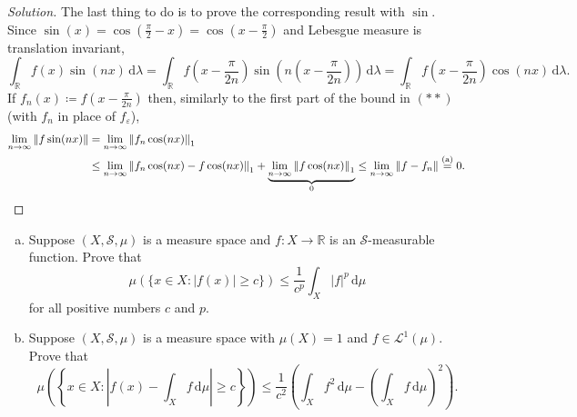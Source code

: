 \documentclass[10pt]{article}
\newcommand{\dd}{\,\mathrm{d}}
\providecommand{\eps}{\varepsilon}
\providecommand{\RR}{\mathbb R}
\providecommand{\ii}{\item}
\newenvironment{soln}{\begin{proof}[Solution]}{\end{proof}}
\providecommand{\abs}[1]{\left\lvert #1\right\rvert}
\providecommand{\norm}[1]{\left\| #1\right\|}
\begin{document}
\begin{soln}
    The last thing to do is to prove the corresponding result with $\sin$.
    Since $\sin(x) = \cos(\frac\pi2 - x) = \cos(x - \frac\pi2)$
    and Lebesgue measure is translation invariant,
    \begin{equation*}
	\int_{\RR} f(x)\sin(nx)\dd\lambda =
	\int_{\RR}f\left(x-\frac\pi{2n}\right)
	\sin\left(n\left(x-\frac\pi{2n}\right)\right)\dd\lambda
	= \int_{\RR}f\left(x-\frac\pi{2n}\right)\cos(nx)\dd\lambda.
    \end{equation*}
    If $f_n(x) \coloneq f(x - \frac\pi{2n})$ then,
    similarly to the first part of the bound in $(**)$
    (with $f_n$ in place of $f_\eps$),
    \begin{align*}
	\lim_{n\to\infty}\norm{f\sin(nx)}
	&= \lim_{n\to\infty} \norm{f_n\cos(nx)}_1\\
	&\le \lim_{n\to\infty} \norm{f_n\cos(nx) - f\cos(nx)}_1
	+ \underbrace{\lim_{n\to\infty} \norm{f\cos(nx)}_1}_{0}
	\le \lim_{n\to\infty}\norm{f - f_n} \overset{\text{(a)}}= 0.\qedhere
    \end{align*}
\end{soln}

\begin{problem}
    [Axler 4A \#1,2]
    \begin{enumerate}[(a)]
        \ii Suppose $(X,\mathcal S,\mu)$ is a measure space and
	$f\colon X\to\RR$ is an $\mathcal S$-measurable function. Prove that
	\begin{equation*}
	    \mu(\{x\in X : \abs{f(x)}\ge c\}) \le
	    \frac 1{c^p}\int_X\abs f^p\dd\mu
	\end{equation*}
	for all positive numbers $c$ and $p$.
	\ii Suppose $(X,\mathcal S,\mu)$ is a measure space
	with $\mu(X) = 1$ and $f\in\mathcal L^1(\mu)$. Prove that
	\begin{equation*}
	    \mu\left(\left\{x\in X: \abs{f(x) - \int_X f\dd\mu} \ge c\right\}\right)
	    \le \frac1{c^2}\left(\int_Xf^2\dd\mu - \left(\int_Xf\dd\mu\right)^2\right).
	\end{equation*}
    \end{enumerate}
\end{problem}
\end{document}
